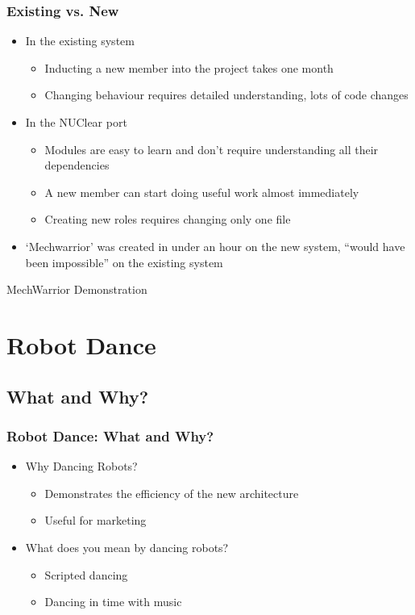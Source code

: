 \documentclass{beamer}
\begin{document}
\begin{frame}
	\frametitle{Existing vs. New}

	\begin{itemize}
		\item In the existing system
		\begin{itemize}
			\item Inducting a new member into the project takes one month
			\item Changing behaviour requires detailed understanding, lots of code changes
		\end{itemize}
		\item In the NUClear port
		\begin{itemize}
			\item Modules are easy to learn and don't require understanding all their dependencies
			\item A new member can start doing useful work almost immediately
			\item Creating new roles requires changing only one file
		\end{itemize}
		\item `Mechwarrior' was created in under an hour on the new system, ``would have been impossible'' on the existing system
	\end{itemize}
\end{frame}

\begin{frame}
	\huge MechWarrior Demonstration
\end{frame}

\section{Robot Dance}
	\begin{frame}
		\sectionpage %
	\end{frame}
	\subsection{What and Why?} %
	\begin{frame}
		\frametitle{Robot Dance: What and Why?}
		\begin{itemize}
			\item Why Dancing Robots?
			\begin{itemize}
				\item Demonstrates the efficiency of the new architecture
				\item Useful for marketing
			\end{itemize}
			\item What does you mean by dancing robots?
			\begin{itemize}
				\item Scripted dancing
				\item Dancing in time with music
			\end{itemize}
		\end{itemize}
	\end{frame}
\end{document}
